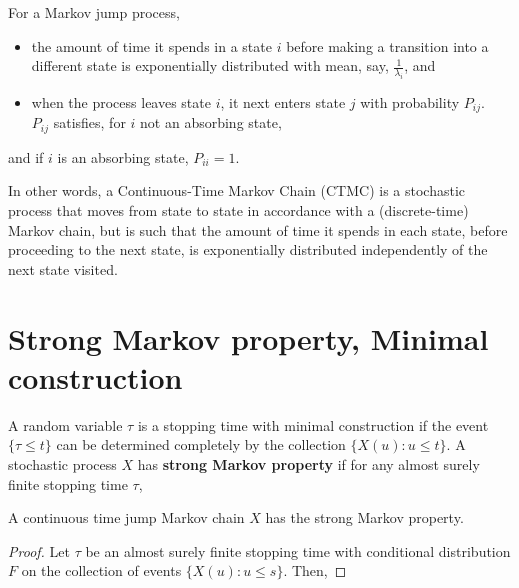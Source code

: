 \documentclass[all-lectures.tex]{subfiles}
\begin{document}
For a Markov jump process,
\begin{itemize}
\item the amount of time it spends in a state $i$ before making a transition into a different
state is exponentially distributed with mean, say, $\frac{1}{\lambda_i}$, and
\item when the process leaves state $i$, it next enters state $j$ with probability $P_{ij}$.
\\$P_{ij}$ satisfies, for $i$ not an absorbing state,
\end{itemize}
and if $i$ is an absorbing state, $P_{ii}=1$.

In other words, a Continuous-Time Markov Chain (CTMC) is a stochastic process that
moves from state to state in accordance with a (discrete-time) Markov chain, but is such that the amount of time it spends in each state, before proceeding to the next state, is exponentially distributed independently of the next state visited. 


\section{Strong Markov property, Minimal construction}

A random variable $\tau$ is a stopping time with minimal construction if the event $\{\tau \leq t\}$ can be determined completely by the collection $\{X(u): u \leqslant t\}$. 
A stochastic process $X$ has \textbf{strong Markov property} if for any almost surely finite stopping time $\tau$, 
\begin{lem}
	\label{Lemma:StrongMarkovProperty}
	A continuous time jump Markov chain $X$ has the strong Markov property. 
\end{lem}
\begin{proof}

	Let $\tau$ be an almost surely finite stopping time with conditional distribution $F$ on the collection of events $\{X(u): u \leq s\}$. 
	Then, 
\end{proof}
\end{document}
